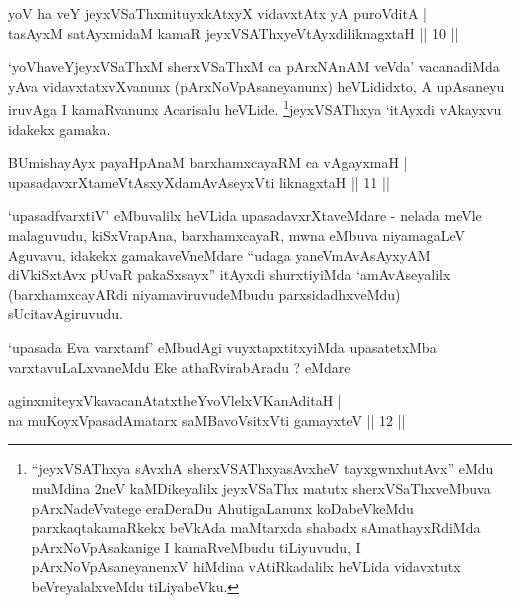 \begin{shl}
yoV ha veY jeyxVSaThxmituyxkAtxyX vidavxtAtx yA puroVditA | \\
tasAyxM satAyxmidaM kamaR jeyxVSAThxyeVtAyxdiliknagxtaH \hfill|| 10 || 
\end{shl}

\begin{artha}
`yoVhaveYjeyxVSaThxM sherxVSaThxM ca pArxNAnAM veVda' vacanadiMda yAva vidavxtatxvXvanunx (pArxNoVpAsaneyanunx) heVLididxto, A upAsaneyu iruvAga I kamaRvanunx Acarisalu heVLide. \footnote{``jeyxVSAThxya sAvxhA sherxVSAThxyasAvxheV tayxgwnxhutAvx'' eMdu muMdina 2neV kaMDikeyalilx jeyxVSaThx matutx sherxVSaThxveMbuva pArxNadeVvatege eraDeraDu AhutigaLanunx koDabeVkeMdu parxkaqtakamaRkekx beVkAda maMtarxda shabadx sAmathayxRdiMda pArxNoVpAsakanige I kamaRveMbudu tiLiyuvudu, I pArxNoVpAsaneyanenxV hiMdina vAtiRkadalilx heVLida vidavxtutx beVreyalalxveMdu tiLiyabeVku.}jeyxVSAThxya `itAyxdi vAkayxvu idakekx gamaka.
\end{artha}

\begin{shl}
BUmishayAyx payaHpAnaM barxhamxcayaRM ca vAgayxmaH | \\
upasadavxrXtameVtAsxyXdamAvAseyxVti liknagxtaH \hfill|| 11 || 
\end{shl}

\begin{artha}
`upasadfvarxtiV' eMbuvalilx heVLida upasadavxrXtaveMdare - nelada meVle malaguvudu, kiSxVrapAna, barxhamxcayaR, mwna eMbuva niyamagaLeV Aguvavu, idakekx gamakaveVneMdare ``udaga yaneV\s mAvAsAyxyAM diVkiSxtAvx pUvaR pakaSxsayx'' itAyxdi shurxtiyiMda `amAvAseyalilx (barxhamxcayARdi niyamaviruvudeMbudu parxsidadhxveMdu) sUcitavAgiruvudu.
\end{artha}

\begin{artha}
`upasada Eva varxtamf' eMbudAgi vuyxtapxtitxyiMda upasatetxMba varxtavuLaLxvaneMdu Eke athaRvirabAradu ? eMdare
\end{artha}

\begin{shl}
aginxmiteyxVkavacanAtatxtheYvoVlelxVKanAditaH | \\
na muKoyxVpasadAmatarx saMBavoV\s sitxVti gamayxteV \hfill|| 12 || 
\end{shl}

